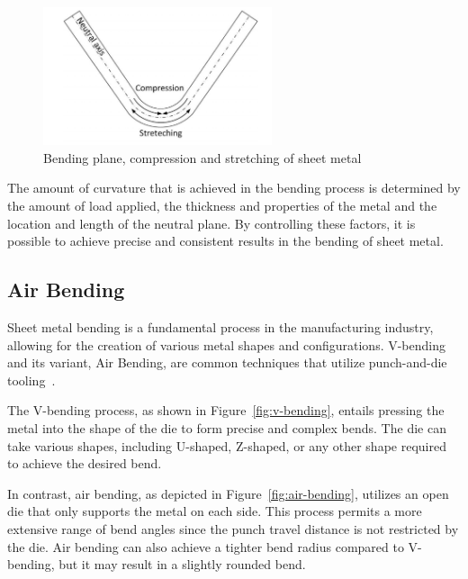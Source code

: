 \begin{figure}[h]
    \begin{tcolorbox}[arc=0pt,boxrule=0.5pt, colback=white]
        \centering
        \includegraphics[width=0.6\textwidth]{chap2/images/neutral-plane}
    \end{tcolorbox}
    \caption{Bending plane, compression and stretching of sheet
    metal~\cite[p. 3]{baig_machinelearningprediction_2021}}
    \label{fig:neutral-plane}
\end{figure}

The amount of curvature that is achieved in the bending process is determined by the
amount of load applied, the thickness and properties of the metal and the location and length of the neutral plane.
By controlling these factors, it is possible to achieve precise and consistent results in the bending of sheet metal.

\subsection{Air Bending}\label{subsec:air-bending}
Sheet metal bending is a fundamental process in the manufacturing industry, allowing for the creation of various
metal shapes and configurations.
V-bending and its variant, Air Bending, are common techniques that utilize punch-and-die
tooling~\cite[p. 416]{groover_fundamentalsmodernmanufacturing_2020}.

The V-bending process, as shown in Figure~\ref{fig:v-bending}, entails pressing the metal into the shape of the die
to form precise and complex bends.
The die can take various shapes, including U-shaped, Z-shaped, or any other shape required to achieve the desired bend.

In contrast, air bending, as depicted in Figure~\ref{fig:air-bending}, utilizes an open die that only supports the
metal on each side. This process permits a more extensive range of bend angles since the punch travel distance is not
restricted by the die. Air bending can also achieve a tighter bend radius compared to V-bending, but it may result in
a slightly rounded bend.

